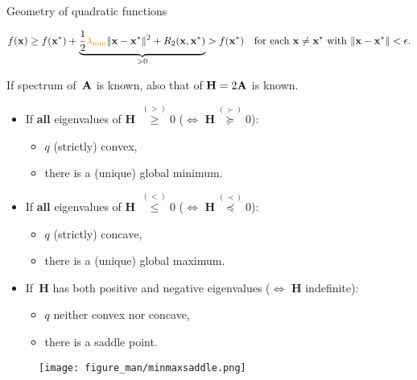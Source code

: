 \documentclass[11pt,compress,t,notes=noshow, xcolor=table]{beamer}
\begin{document}
\begin{vbframe}{Geometry of quadratic functions}
    \vspace{-1.25\baselineskip}

    \begin{equation*}
        f(\mathbf{x}) \geq f(\mathbf{x}^\ast) + \underbrace{\frac{1}{2} \textcolor{orange}{\lambda_\text{min}} \|\mathbf{x}-\mathbf{x}^\ast\|^2 + R_2(\mathbf{x},\mathbf{x}^\ast)}_{>0} > f(\mathbf{x}^\ast) \quad\text{for each $\mathbf{x} \neq \mathbf{x}^\ast$ with $\|\mathbf{x}-\mathbf{x}^\ast\|<\epsilon$}.
    \end{equation*}


\framebreak

If spectrum of~$\mathbf{A}$ is known, also that of $\mathbf{H} = 2\mathbf{A}$ is known.

\begin{itemize}
    \item If \textbf{all} eigenvalues of $\mathbf{H}$ $\overset{(>)}{\geq} 0$ ($\Leftrightarrow$ $\mathbf{H} \overset{(\succ)}{\succcurlyeq} 0$):
        \begin{itemize} 
            \item $q$ (strictly) convex,
            \item there is a (unique) global minimum. 
        \end{itemize}
    \item If \textbf{all} eigenvalues of $\mathbf{H}$ $\overset{(<)}{\leq} 0$ ($\Leftrightarrow$ $\mathbf{H} \overset{(\prec)}{\preccurlyeq} 0$):
        \begin{itemize} 
            \item $q$ (strictly) concave,
            \item there is a (unique) global maximum. 
        \end{itemize}
    \item If~$\mathbf{H}$ has both positive and negative eigenvalues ($\Leftrightarrow$ $\mathbf{H}$ indefinite):
        \begin{itemize}
            \item $q$ neither convex nor concave,
            \item there is a saddle point.
        \end{itemize}
\end{itemize}


\begin{figure}
    \centering
    \texttt{[image: figure\_man/minmaxsaddle.png]}
\end{figure}

\end{vbframe}
\end{document}

